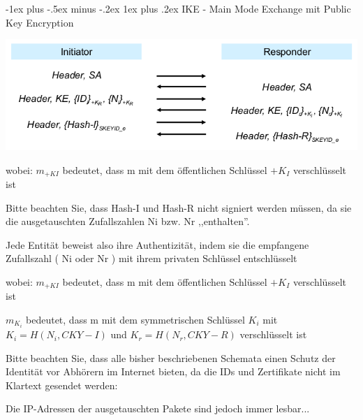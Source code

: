\documentclass[a4paper]{article}
\makeatletter
\renewcommand{\subsubsection}{\@startsection{subsubsection}{3}{0mm}%
 {-1ex plus -.5ex minus -.2ex}%
 {1ex plus .2ex}%
 {\normalfont\small\bfseries}}
\makeatother
\begin{document}
\begin{multicols}{3}
      \subsubsection{IKE - Main Mode Exchange mit Public Key Encryption}
      \begin{itemize*}
            \item \includegraphics[width=\linewidth]{Assets/NetworkSecurity-IKE-exchange-public-key.png}
            \begin{itemize*}
                  \item wobei: ${m}_{+KI}$ bedeutet, dass m mit dem öffentlichen Schlüssel $+K_I$ verschlüsselt ist
                  \item Bitte beachten Sie, dass Hash-I und Hash-R nicht signiert werden müssen, da sie die ausgetauschten Zufallszahlen Ni bzw. Nr ,,enthalten''.
                  \begin{itemize*} \item Jede Entität beweist also ihre Authentizität, indem sie die empfangene Zufallszahl ( Ni oder Nr ) mit ihrem privaten Schlüssel entschlüsselt \end{itemize*}
            \end{itemize*}
            \begin{itemize*}
                  \item wobei: ${m}_{+KI}$ bedeutet, dass m mit dem öffentlichen Schlüssel $+K_I$ verschlüsselt ist
                  \item ${m}_{K_i}$ bedeutet, dass m mit dem symmetrischen Schlüssel $K_i$ mit $K_i=H(N_i, CKY-I)$ und $K_r=H(N_r,CKY-R)$ verschlüsselt ist
                  \item Bitte beachten Sie, dass alle bisher beschriebenen Schemata einen Schutz der Identität vor Abhörern im Internet bieten, da die IDs und Zertifikate nicht im Klartext gesendet werden:
                  \item Die IP-Adressen der ausgetauschten Pakete sind jedoch immer lesbar...
            \end{itemize*}
      \end{itemize*}


\end{multicols}
\end{document}
